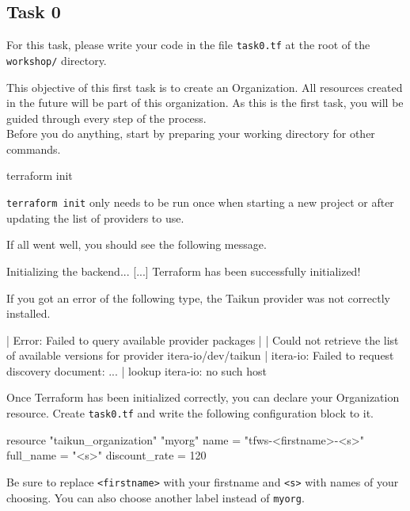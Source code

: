 \subsection{Task 0}\label{sec:task0}

\begin{note}
For this task, please write your code in the file \texttt{task0.tf}
at the root of the \texttt{workshop/} directory.
\end{note}

This objective of this first task is to create an Organization.
All resources created in the future will be part of this organization.
As this is the first task, you will be guided through every step of the process.\\

Before you do anything, start by preparing your working directory for other commands.
\begin{shell}
terraform init
\end{shell}
\begin{info}
\texttt{terraform init} only needs to be run once when starting a new project or after updating
the list of providers to use.
\end{info}
If all went well, you should see the following message.
\begin{raw}
Initializing the backend...
[...]
Terraform has been successfully initialized!
\end{raw}
If you got an error of the following type, the Taikun provider was not correctly installed.
\begin{raw}
| Error: Failed to query available provider packages
|
| Could not retrieve the list of available versions for provider itera-io/dev/taikun
| itera-io: Failed to request discovery document: ...
| lookup itera-io: no such host
\end{raw}

Once Terraform has been initialized correctly, you can declare your Organization resource.
Create \texttt{task0.tf} and write the following configuration block to it.
\begin{tf}
resource "taikun_organization" "myorg" {
  name          = "tfws-<firstname>-<s>"
  full_name     = "<s>"
  discount_rate = 120
}
\end{tf}
Be sure to replace \texttt{<firstname>} with your firstname and \texttt{<s>} with
names of your choosing. You can also choose another label instead of \texttt{myorg}.

